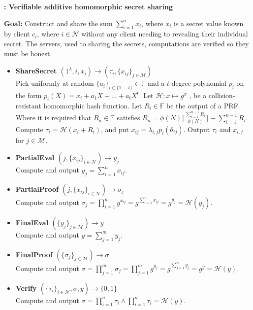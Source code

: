 \begin{algorithm}
\label{alg:VAHSS-HSS}
\caption{\textbf{: Verifiable additive homomorphic secret sharing}}
\textbf{Goal:} Construct and share the sum $\sum_{i=1}^n x_i$, where $x_i$ is a secret value known by client $c_i$, where $i\in\mathcal{N}$ without any client needing to revealing their individual secret. The servers, used to sharing the secrets, computations are verified so they must be honest. 
\vspace{2pt}
\hline
\vspace{2pt}
\begin{itemize}
  \item\textbf{ShareSecret $(1^\lambda,i,x_i)\xrightarrow[]{}(\tau_i,\{x_{ij}\}_{j\in\mathcal{M}})$}\\
Pick uniformly at random $\{a_i\}_{i\in\{1,..,t\}}\in\mathds{F}$ and a $t$-degree polynomial $p_i$ on the form $p_i(X) = x_i + a_1X+...+a_tX^t$. Let $\mathcal{H}:x\mapsto g^x$
, be a collision-resistant homomorphic hash function. Let $R_i\in\mathds{F}$ be the output of a PRF. Where it is required that  $R_n\in \mathds{F}$  satisfies
$R_n = \phi(N)\lceil \frac{\sum_{i=1}^{n-1}R_i}{\phi(N)}\rceil- \sum_{i=1}^{n-1}R_i $. Compute $\tau_i = \mathcal{H}(x_i+R_i)$, and put $x_{ij}=\lambda_{i,j}p_i(\theta_{ij})$.  Output $\tau_i$ and $x_{i,j}$ for $j\in\mathcal{M}$. 

\item\textbf{PartialEval $(j,\{x_{ij}\}_{i\in\mathcal{N}})\xrightarrow[]{}y_j$}\\
Compute and output $y_j = \sum_{i=1}^n x_{ij}$.

\item\textbf{PartialProof $(j,\{x_{ij}\}_{i\in\mathcal{N}})\xrightarrow[]{}\sigma_j$}\\
Compute and output $\sigma_j = \prod_{i=1}^n g^{x_{ij}} =  g^{\sum_{i=1}^n x_{ij}}= g^{y_j}=\mathcal{H}(y_j)$.

\item\textbf{FinalEval $(\{y_j\}_{j\in\mathcal{M}})\xrightarrow[]{}y$}\\
Compute and output $y = \sum_{j=1}^m y_{j}$.

\item\textbf{FinalProof $(\{\sigma_j\}_{j\in\mathcal{M}})\xrightarrow[]{}\sigma$}\\
Compute and output $\sigma = \prod_{j=1}^m \sigma_j = \prod_{j=1}^m g^{y_{j}} =  g^{\sum_{j=1}^m y_{j}}= g^{y}=\mathcal{H}(y)$.

\item\textbf{Verify $(\{\tau_i\}_{i\in\mathcal{N}},\sigma,y)\xrightarrow[]{}\{0,1\}$}\\
Compute and output $\sigma= \prod_{i=1}^n \tau_i \wedge \prod_{i=1}^n \tau_i = \mathcal{H}(y)$.
\end{itemize}
\end{algorithm}

